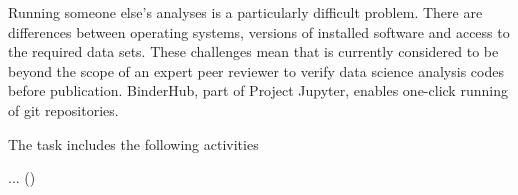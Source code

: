 \begin{task}[
  title=Further development of repo2docker and Binder,
  id=r2d-and-binder,
  lead=SRL,
  PM=42,
  wphases={0-48},
  partners={XFEL,SRL,WTT}
]
  Running someone else's analyses is a particularly difficult problem.
  There are differences between operating systems, versions of installed software and access to the required data sets.
  These challenges mean that is currently considered to be beyond the scope of an expert peer reviewer to verify data science analysis codes before publication.
  BinderHub, part of Project Jupyter, enables one-click running of git repositories.

  The task includes the following activities
  \begin{compactitem}
  \item ...
    ()
  \end{compactitem}
\end{task}
